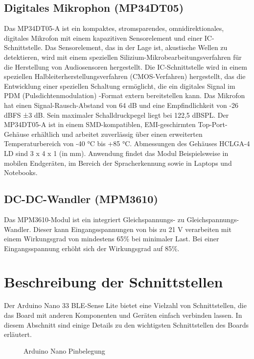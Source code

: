 \subsection{Digitales Mikrophon (MP34DT05)}
Das MP34DT05-A ist ein kompaktes, stromsparendes, omnidirektionales, digitales
Mikrofon mit einem kapazitiven Sensorelement und einer IC-Schnittstelle.
Das Sensorelement, das in der Lage ist, akustische Wellen zu detektieren, wird mit
einem speziellen Silizium-Mikrobearbeitungsverfahren für die Herstellung von
Audiosensoren hergestellt. Die IC-Schnittstelle wird in einem speziellen Halbleiterherstellungsverfahren (CMOS-Verfahren) hergestellt, das die Entwicklung einer speziellen Schaltung ermöglicht, die ein digitales Signal im PDM (Pulsdichtenmodulation) -Format extern bereitstellen kann. Das Mikrofon hat einen Signal-Rausch-Abstand von 64 dB und eine Empfindlichkeit von -26 dBFS ±3 dB. Sein maximaler Schalldruckpegel liegt bei 122,5 dBSPL. Der MP34DT05-A ist in einem SMD-kompatiblen, EMI-geschirmten Top-Port-Gehäuse erhältlich und arbeitet zuverlässig über einen erweiterten Temperaturbereich von -40 °C bis +85 °C. Abmessungen des Gehäuses HCLGA-4 LD sind 3 x 4 x 1 (in mm). Anwendung findet das Modul Beispielsweise in mobilen Endgeräten, im Bereich der Spracherkennung sowie in Laptops und Notebooks.\cite{STM3.2021}\cite{Ard.2024}

\subsection{DC-DC-Wandler (MPM3610)}
Das MPM3610-Modul ist ein integriert Gleichspannungs- zu Gleichspannungs-Wandler. Dieser kann Eingangsspannungen von bis zu 21 V verarbeiten mit einem Wirkungsgrad von mindestens 65\% bei minimaler Last. Bei einer Eingangsspannung erhöht sich der Wirkungsgrad auf 85\%.\cite{Ard.2024}

\section{Beschreibung der Schnittstellen}
Der Arduino Nano 33 BLE-Sense Lite bietet eine Vielzahl von Schnittstellen, die das Board mit anderen Komponenten und Geräten einfach verbinden lassen. In diesem Abschnitt sind einige Details zu den wichtigsten Schnittstellen des Boards erläutert.
\begin{figure}
	
	\caption{Arduino Nano Pinbelegung \cite{Ard.2024}}
	\label{fig:arduinopinout}
\end{figure}

